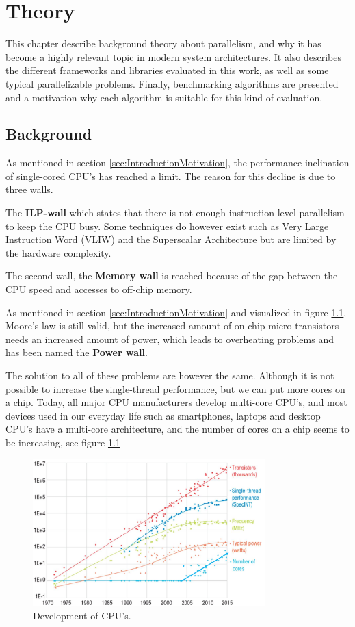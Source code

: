 
\chapter{Theory}
This chapter describe background theory about parallelism, and why it has become a highly relevant topic in modern system architectures. It also describes the different frameworks and libraries evaluated in this work, as well as some typical parallelizable problems. Finally, benchmarking algorithms are presented and a motivation why each algorithm is suitable for this kind of evaluation.

\section{Background} 
As mentioned in section \ref{sec:IntroductionMotivation}, the performance inclination of single-cored CPU's has reached a limit. The reason for this decline is due to three walls.

The \textbf{ILP-wall} which states that there is not enough instruction level parallelism to keep the CPU busy. Some techniques do however exist such as Very Large Instruction Word (VLIW) and the Superscalar Architecture but are limited by the hardware complexity.

The second wall, the \textbf{Memory wall} is reached because of the gap between the CPU speed and accesses to off-chip memory.

As mentioned in section \ref{sec:IntroductionMotivation} and visualized in figure \ref{fig:CPUstats}, Moore's law is still valid, but the increased amount of on-chip micro transistors needs an increased amount of power, which leads to overheating problems and has been named the \textbf{Power wall}.

The solution to all of these problems are however the same. Although it is not possible to increase the single-thread performance, but we can put more cores on a chip. Today, all major CPU manufacturers develop multi-core CPU's, and most devices used in our everyday life such as smartphones, laptops 
and desktop CPU's have a multi-core architecture, and the number of cores on a chip seems to be increasing, see figure \ref{fig:CPUstats}

\begin{figure}[!h]
    \centering
    \includegraphics[width=0.8\textwidth]{Introduction/Figs/CPUStats.png}
    \caption{Development of CPU's. \cite{CPUStats}}
    \label{fig:CPUstats}
\end{figure}

